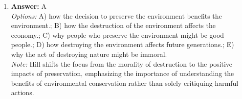 \documentclass[12pt]{article}
\begin{document}
\begin{enumerate}[label=\arabic*.]
\\ \textit{Note:} Metz argues that dignity is rooted in the ability to engage in communal or friendly relationships because these interactions highlight the intrinsic value of individuals and their capacity for mutual respect and connection, which is essential for recognizing and upholding human dignity.
\item \textbf{Answer:} A
\\ \textit{Options:} A) how the decision to preserve the environment benefits the environment.; B) how the destruction of the environment affects the economy.; C) why people who preserve the environment might be good people.; D) how destroying the environment affects future generations.; E) why the act of destroying nature might be immoral.
\\ \textit{Note:} Hill shifts the focus from the morality of destruction to the positive impacts of preservation, emphasizing the importance of understanding the benefits of environmental conservation rather than solely critiquing harmful actions.
\end{enumerate}
\end{document}
